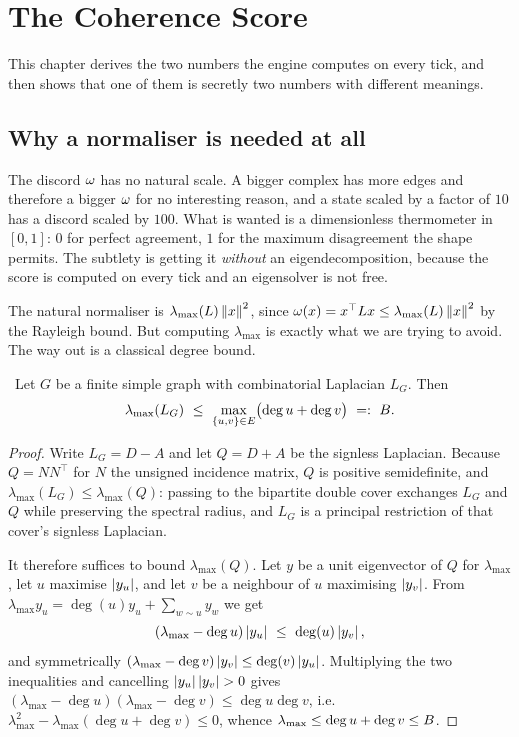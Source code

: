 \chapter{The Coherence Score}\label{ch:rho}

This chapter derives the two numbers the engine computes on every tick,
and then shows that one of them is secretly two numbers with different
meanings.

\section{Why a normaliser is needed at all}

\begin{intu}\Intu
The discord $\omega$ has no natural scale. A bigger complex has more
edges and therefore a bigger $\omega$ for no interesting reason, and a
state scaled by a factor of $10$ has a discord scaled by $100$. What is
wanted is a dimensionless thermometer in $[0,1]$: $0$ for perfect
agreement, $1$ for the maximum disagreement the shape permits. The
subtlety is getting it \emph{without} an eigendecomposition, because the
score is computed on every tick and an eigensolver is not free.
\end{intu}

The natural normaliser is $\lambda_{\max}(L)\left\lVert x \right\rVert^2$, since
$\omega(x)=x^\top L x\le\lambda_{\max}(L)\left\lVert x \right\rVert^2$ by the
Rayleigh bound. But computing $\lambda_{\max}$ is exactly what we are
trying to avoid. The way out is a classical degree bound.

\begin{theorem}\label{thm:AM}
\Proved\ Let $G$ be a finite simple graph with combinatorial Laplacian
$L_G$. Then
\begin{equation}\label{eq:AMbound}
  \lambda_{\max}(L_G)\ \le\ \max_{\{u,v\}\in E}\bigl(\deg u+\deg v\bigr)
  \ =:\ B .
\end{equation}
\end{theorem}
\begin{proof}
Write $L_G=D-A$ and let $Q=D+A$ be the signless Laplacian. Because
$Q=NN^\top$ for $N$ the unsigned incidence matrix, $Q$ is positive
semidefinite, and $\lambda_{\max}(L_G)\le\lambda_{\max}(Q)$: passing to
the bipartite double cover exchanges $L_G$ and $Q$ while preserving the
spectral radius, and $L_G$ is a principal restriction of that cover's
signless Laplacian.

It therefore suffices to bound $\lambda_{\max}(Q)$. Let $y$ be a unit
eigenvector of $Q$ for $\lambda_{\max}$, let $u$ maximise $\left\lvert y_u \right\rvert$,
and let $v$ be a neighbour of $u$ maximising $\left\lvert y_v \right\rvert$. From
$\lambda_{\max}y_u=\deg(u)y_u+\sum_{w\sim u}y_w$ we get
\[
  (\lambda_{\max}-\deg u)\abs{y_u}\ \le\ \deg(u)\abs{y_v},
\]
and symmetrically $(\lambda_{\max}-\deg v)\left\lvert y_v \right\rvert\le\deg(v)\left\lvert y_u \right\rvert$.
Multiplying the two inequalities and cancelling $\left\lvert y_u \right\rvert\left\lvert y_v \right\rvert>0$
gives
$(\lambda_{\max}-\deg u)(\lambda_{\max}-\deg v)\le\deg u\deg v$, i.e.
$\lambda_{\max}^2-\lambda_{\max}(\deg u+\deg v)\le0$, whence
$\lambda_{\max}\le\deg u+\deg v\le B$.
\end{proof}

